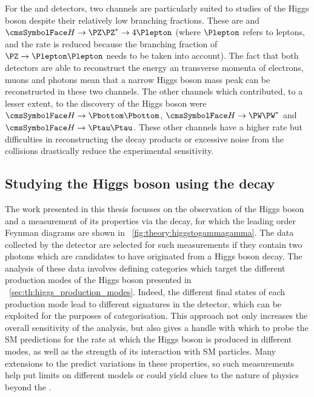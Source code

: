 For the \CMS and \ATLAS detectors, two channels are particularly suited to studies of the Higgs boson despite their relatively low branching fractions. These are \Hgg and $\PH \rightarrow \PZ \PZ^{*} \rightarrow 4 \Plepton $ (where $\Plepton$ refers to leptons, and the rate is reduced because the branching fraction of $\PZ\rightarrow \Plepton\Plepton$ needs to be taken into account). The fact that both detectors are able to reconstruct the energy an transverse momenta of electrons, muons and photons mean that a narrow Higgs boson mass peak can be reconstructed in these two channels. The other channels which contributed, to a lesser extent, to the discovery of the Higgs boson were $\PH \rightarrow \Pbottom \Pbottom$, $\PH \rightarrow \PW \PW^{*} $ and  $\PH \rightarrow \Ptau \Ptau$. %
These other channels have a higher rate but difficulties in reconstructing the decay products or excessive noise from the \LHC \pp collisions drastically reduce the experimental sensitivity. 



\subsection{Studying the Higgs boson using the \Hgg decay}

The work presented in this thesis focusses on the observation of the Higgs boson and a measurement of its properties via the \Hgg decay, for which the leading order Feynman diagrams are shown in \Fig~\ref{fig:theory:higgstogammagamma}. The data collected by the \CMS detector are selected for such measurements if they contain two photons which are candidates to have originated from a Higgs boson decay. The analysis of these data involves defining categories which target the different production modes of the Higgs boson presented in \Sec~\ref{sec:th:higgs_production_modes}. Indeed, the different final states of each production mode lead to different signatures in the detector, which can be exploited for the purposes of categorisation. This approach not only increases the overall sensitivity of the analysis, but also gives a handle with which to probe the SM predictions for the rate at which the Higgs boson is produced in different modes, as well as the strength of its interaction with SM particles. Many extensions to the \SM predict variations in these properties, so such measurements help put limits on different models or could yield clues to the nature of physics beyond the \SM.

